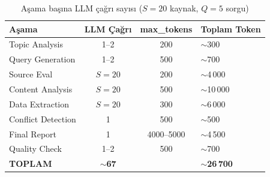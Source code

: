 \begin{table}[H]
\centering
\caption{A\c{s}ama ba\c{s}{\i}na LLM \c{c}a\u{g}r{\i} say{\i}s{\i} ($S=20$ kaynak, $Q=5$ sorgu)}
\label{tab:llm_calls}
\begin{tabularx}{\textwidth}{lccX}
\toprule
\color{chapterBlue}\textbf{A\c{s}ama} & \color{chapterBlue}\textbf{LLM \c{C}a\u{g}r{\i}} & \color{chapterBlue}\textbf{max\_tokens} & \color{chapterBlue}\textbf{Toplam Token} \\
\midrule
Topic Analysis    & 1--2  & 200   & $\sim$300   \\
Query Generation  & 1--2  & 500   & $\sim$700   \\
Source Eval       & $S=20$ & 200  & $\sim$4\,000 \\
Content Analysis  & $S=20$ & 500  & $\sim$10\,000 \\
Data Extraction   & $S=20$ & 300  & $\sim$6\,000 \\
Conflict Detection & 1    & 500   & $\sim$500   \\
Final Report      & 1     & 4000--5000 & $\sim$4\,500 \\
Quality Check     & 1--2  & 500   & $\sim$700   \\
\midrule
\textbf{TOPLAM}   & \textbf{$\sim$67} & & \textbf{$\sim$26\,700} \\
\bottomrule
\end{tabularx}
\end{table}

